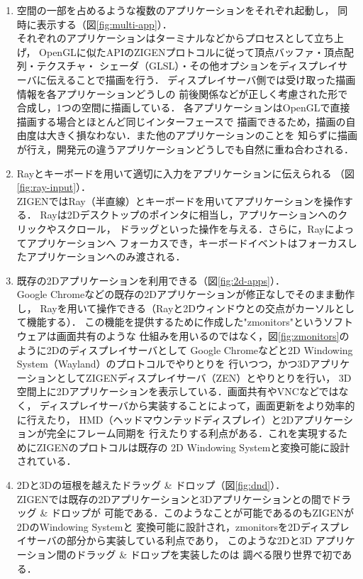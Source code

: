 \begin{enumerate}
  \item 空間の一部を占めるような複数のアプリケーションをそれぞれ起動し，
        同時に表示する（図\ref{fig:multi-app}）．\\
        それぞれのアプリケーションはターミナルなどからプロセスとして立ち上げ，
        OpenGLに似たAPIのZIGENプロトコルに従って頂点バッファ・頂点配列・テクスチャ・
        シェーダ（GLSL）・その他オプションをディスプレイサーバに伝えることで描画を行う．
        ディスプレイサーバ側では受け取った描画情報を各アプリケーションどうしの
        前後関係などが正しく考慮された形で合成し，1つの空間に描画している．
        各アプリケーションはOpenGLで直接描画する場合とほとんど同じインターフェースで
        描画できるため，描画の自由度は大きく損なわない．また他のアプリケーションのことを
        知らずに描画が行え，開発元の違うアプリケーションどうしでも自然に重ね合わされる．
  \item Rayとキーボードを用いて適切に入力をアプリケーションに伝えられる
        （図\ref{fig:ray-input}）． \\
        ZIGENではRay（半直線）とキーボードを用いてアプリケーションを操作する．
        Rayは2Dデスクトップのポインタに相当し，アプリケーションへのクリックやスクロール，
        ドラッグといった操作を与える．さらに，Rayによってアプリケーションへ
        フォーカスでき，キーボードイベントはフォーカスしたアプリケーションへのみ渡される．
  \item 既存の2Dアプリケーションを利用できる（図\ref{fig:2d-apps}）．\\
        Google Chromeなどの既存の2Dアプリケーションが修正なしでそのまま動作し，
        Rayを用いて操作できる（Rayと2Dウィンドウとの交点がカーソルとして機能する）．
        この機能を提供するために作成した"zmonitors"というソフトウェアは画面共有のような
        仕組みを用いるのではなく，図\ref{fig:zmonitors}のように2Dのディスプレイサーバとして
        Google Chromeなどと2D Windowing System（Wayland）のプロトコルでやりとりを
        行いつつ，かつ3DアプリケーションとしてZIGENディスプレイサーバ（ZEN）とやりとりを行い，
        3D空間上に2Dアプリケーションを表示している．画面共有やVNCなどではなく，
        ディスプレイサーバから実装することによって，画面更新をより効率的に行えたり，
        HMD（ヘッドマウンテッドディスプレイ）と2Dアプリケーションが完全にフレーム同期を
        行えたりする利点がある．これを実現するためにZIGENのプロトコルは既存の
        2D Windowing Systemと変換可能に設計されている．
  \item 2Dと3Dの垣根を越えたドラッグ \& ドロップ（図\ref{fig:dnd}）． \\
        ZIGENでは既存の2Dアプリケーションと3Dアプリケーションとの間でドラッグ \& ドロップが
        可能である．このようなことが可能であるのもZIGENが2DのWindowing Systemと
        変換可能に設計され，zmonitorsを2Dディスプレイサーバの部分から実装している利点であり，
        このような2Dと3D アプリケーション間のドラッグ \& ドロップを実装したのは
        調べる限り世界で初である．
\end{enumerate}

